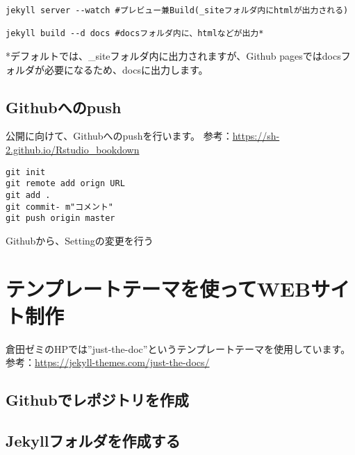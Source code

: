 \documentclass[
]{book}
\begin{document}
\begin{verbatim}
jekyll server --watch #プレビュー兼Build(_siteフォルダ内にhtmlが出力される)
 
jekyll build --d docs #docsフォルダ内に、htmlなどが出力*
\end{verbatim}

*デフォルトでは、\_siteフォルダ内に出力されますが、Github pagesではdocsフォルダが必要になるため、docsに出力します。

\hypertarget{githubux3078ux306epush}{%
\section{Githubへのpush}\label{githubux3078ux306epush}}

公開に向けて、Githubへのpushを行います。
参考：\url{https://sh-2.github.io/Rstudio_bookdown}

\begin{verbatim}
git init
git remote add orign URL
git add .
git commit- m"コメント"
git push origin master
\end{verbatim}

Githubから、Settingの変更を行う

\hypertarget{ux30c6ux30f3ux30d7ux30ecux30fcux30c8ux30c6ux30fcux30deux3092ux4f7fux3063ux3066webux30b5ux30a4ux30c8ux5236ux4f5c}{%
\chapter{テンプレートテーマを使ってWEBサイト制作}\label{ux30c6ux30f3ux30d7ux30ecux30fcux30c8ux30c6ux30fcux30deux3092ux4f7fux3063ux3066webux30b5ux30a4ux30c8ux5236ux4f5c}}

倉田ゼミのHPでは''just-the-doc''というテンプレートテーマを使用しています。
参考：\url{https://jekyll-themes.com/just-the-docs/}

\hypertarget{githubux3067ux30ecux30ddux30b8ux30c8ux30eaux3092ux4f5cux6210}{%
\section{Githubでレポジトリを作成}\label{githubux3067ux30ecux30ddux30b8ux30c8ux30eaux3092ux4f5cux6210}}

\hypertarget{jekyllux30d5ux30a9ux30ebux30c0ux3092ux4f5cux6210ux3059ux308b}{%
\section{Jekyllフォルダを作成する}\label{jekyllux30d5ux30a9ux30ebux30c0ux3092ux4f5cux6210ux3059ux308b}}
\end{document}
